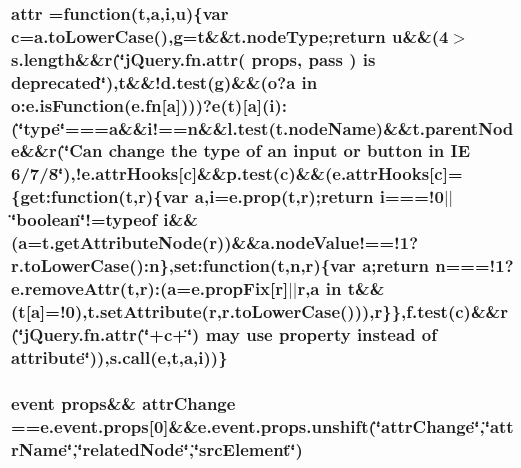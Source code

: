 \subsubsection[{attr}]{ attr =function({\bf t},{\bf a},{\bf i},{\bf u})\{var {\bf c}=a.\+to\+Lower\+Case(),{\bf g}={\bf t}\&\&t.\+node\+Type;return {\bf u}\&\&(4$>$s.\+length\&\&{\bf r}(\char`\"{}j\+Query.\+fn.\+attr( props, pass ) is deprecated\char`\"{}),t\&\&!d.\+test({\bf g})\&\&({\bf o}?{\bf a} in o\+:e.\+is\+Function({\bf e.\+fn}\mbox{[}{\bf a}\mbox{]})))?{\bf e}({\bf t})\mbox{[}{\bf a}\mbox{]}({\bf i})\+:(\char`\"{}type\char`\"{}===a\&\&i!=={\bf n}\&\&l.\+test(t.\+node\+Name)\&\&{\bf t.\+parent\+Node}\&\&{\bf r}(\char`\"{}Can change the \textquotesingle{}type\textquotesingle{} of an input or {\bf button} in I\+E 6/7/8\char`\"{}),!e.\+attr\+Hooks\mbox{[}{\bf c}\mbox{]}\&\&p.\+test({\bf c})\&\&(e.\+attr\+Hooks\mbox{[}{\bf c}\mbox{]}=\{get\+:function({\bf t},{\bf r})\{var {\bf a},{\bf i}=e.\+prop({\bf t},{\bf r});return {\bf i}===!0$\vert$$\vert$\char`\"{}boolean\char`\"{}!=typeof {\bf i}\&\&({\bf a}=t.\+get\+Attribute\+Node({\bf r}))\&\&a.\+node\+Value!==!1?r.\+to\+Lower\+Case()\+:{\bf n}\},set\+:function({\bf t},{\bf n},{\bf r})\{var {\bf a};return {\bf n}===!1?e.\+remove\+Attr({\bf t},{\bf r})\+:({\bf a}=e.\+prop\+Fix\mbox{[}{\bf r}\mbox{]}$\vert$$\vert${\bf r},{\bf a} in {\bf t}\&\&({\bf t}\mbox{[}{\bf a}\mbox{]}=!0),t.\+set\+Attribute({\bf r},r.\+to\+Lower\+Case())),{\bf r}\}\},f.\+test({\bf c})\&\&{\bf r}(\char`\"{}j\+Query.\+fn.\+attr(\textquotesingle{}\char`\"{}+c+\char`\"{}\textquotesingle{}) may use {\bf property} instead of attribute\char`\"{})),s.\+call({\bf e},{\bf t},{\bf a},{\bf i}))\}}\label{jquery-migrate-1_82_81_8min_8js_a571977117149de472ef2f4cd0087bc92}
\hypertarget{jquery-migrate-1_82_81_8min_8js_a68b4be885a1e4895f79417999469377d}{}
\subsubsection[{attr\+Change}]{ {\bf event} props\&\& attr\+Change ==e.\+event.\+props\mbox{[}0\mbox{]}\&\&e.\+event.\+props.\+unshift(\char`\"{}attr\+Change\char`\"{},\char`\"{}attr\+Name\char`\"{},\char`\"{}related\+Node\char`\"{},\char`\"{}src\+Element\char`\"{})}\label{jquery-migrate-1_82_81_8min_8js_a68b4be885a1e4895f79417999469377d}
\hypertarget{jquery-migrate-1_82_81_8min_8js_aa4026ad5544b958e54ce5e106fa1c805}{}
